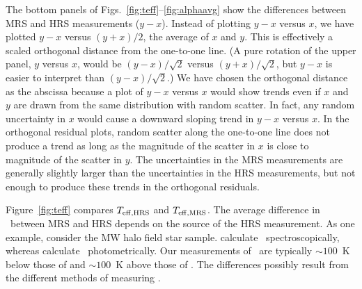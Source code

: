 \documentclass{emulateapj}
\begin{document}
The bottom panels of Figs.~\ref{fig:teff}--\ref{fig:alphaavg} show the
differences between MRS and HRS measurements ($y-x$).  Instead of
plotting $y-x$ versus $x$, we have plotted $y-x$ versus $(y+x)/2$, the
average of $x$ and $y$.  This is effectively a scaled orthogonal
distance from the one-to-one line.  (A pure rotation of the upper
panel, $y$ versus $x$, would be $(y-x)/\sqrt{2}$ versus
$(y+x)/\sqrt{2}$, but $y-x$ is easier to interpret than
$(y-x)/\sqrt{2}$.)  We have chosen the orthogonal distance as the
abscissa because a plot of $y-x$ versus $x$ would show trends even if
$x$ and $y$ are drawn from the same distribution with random scatter.
In fact, any random uncertainty in $x$ would cause a downward sloping
trend in $y-x$ versus $x$.  In the orthogonal residual plots, random
scatter along the one-to-one line does not produce a trend as long as
the magnitude of the scatter in $x$ is close to magnitude of the
scatter in $y$.  The uncertainties in the MRS measurements are
generally slightly larger than the uncertainties in the HRS
measurements, but not enough to produce these trends in the orthogonal
residuals.


Figure~\ref{fig:teff} compares $T_{\rm eff,HRS}$ and $T_{\rm
  eff,MRS}$.  The average difference in \teff\ between MRS and HRS
depends on the source of the HRS measurement.  As one example,
consider the MW halo field star sample.  \citet{joh02} calculate
\teff\ spectroscopically, whereas \citet{lai04,lai07} calculate
\teff\ photometrically.  Our measurements of \teff\ are typically
$\sim 100$~K below those of \citet{joh02} and $\sim 100$~K above those
of \citet{lai04,lai07}.  The differences possibly result from the
different methods of measuring \teff.
\end{document}
